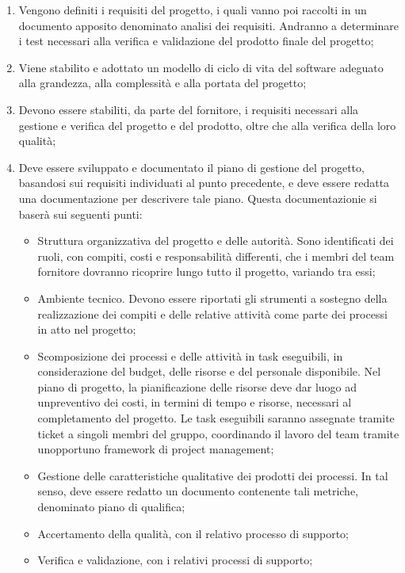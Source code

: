 \begin{enumerate}
    \item Vengono definiti i requisiti del progetto, i quali vanno poi raccolti in un documento apposito denominato analisi dei requisiti. Andranno a determinare i test necessari alla verifica e validazione del prodotto finale del progetto;
    \item Viene stabilito e adottato un modello di ciclo di vita del software adeguato alla grandezza, alla complessità e alla portata del progetto;
    \item Devono essere stabiliti, da parte del fornitore, i requisiti necessari alla gestione e verifica del progetto e del prodotto, oltre che alla verifica della loro qualità;
    \item Deve essere sviluppato e documentato il piano di gestione del progetto, basandosi sui requisiti individuati al punto precedente, e deve essere redatta una documentazione per descrivere tale piano. Questa documentazionie si baserà sui seguenti punti:
    \begin{itemize}
        \item Struttura organizzativa del progetto e delle autorità. Sono identificati dei ruoli, con compiti, costi e responsabilità differenti, che i membri del team fornitore dovranno ricoprire lungo tutto il progetto, variando tra essi;
        \item Ambiente tecnico. Devono essere riportati gli strumenti a sostegno della realizzazione dei compiti e delle relative attività come parte dei processi in atto nel progetto;
        \item Scomposizione dei processi e delle attività in task eseguibili, in considerazione del budget, delle risorse e del personale disponibile. Nel piano di progetto, la pianificazione delle risorse deve dar luogo ad unpreventivo dei costi, in termini di tempo e risorse, necessari al completamento del progetto. Le task eseguibili saranno assegnate tramite ticket a singoli membri del gruppo, coordinando il lavoro del team tramite unopportuno framework di project management;
        \item Gestione delle caratteristiche qualitative dei prodotti dei processi. In tal senso, deve essere redatto un documento contenente tali metriche, denominato piano di qualifica;
        \item Accertamento della qualità, con il relativo processo di supporto;
        \item Verifica e validazione, con i relativi processi di supporto;

\end{itemize}
\end{enumerate}
